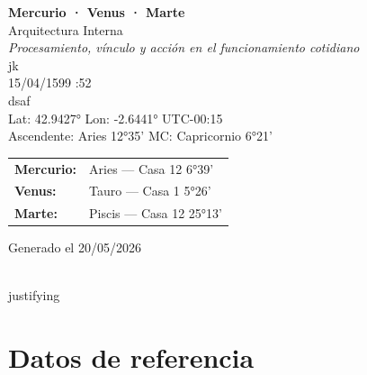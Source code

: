 \documentclass[11pt,a4paper]{article}
\begin{document}

\begin{titlepage}
  \centering

  \vspace*{2cm}

  {\Huge\bfseries\color{azulai} Mercurio · Venus · Marte}\\[0.6cm]

  {\large\color{grisai} Arquitectura Interna}\\[0.4cm]

  {\small\itshape\color{grisai}
  Procesamiento, vínculo y acción en el funcionamiento cotidiano
  }\\[2.2cm]

  {\huge\color{doradoai} jk}\\[1.6cm]

  {\Large 15/04/1599 :52}\\[0.35cm]

  {\Large dsaf}\\[0.35cm]

  {\normalsize
  Lat: 42.9427° \quad
  Lon: -2.6441° \quad
  UTC-00:15
  }\\[0.35cm]

  {\normalsize
  Ascendente: Aries 12°35'
  \quad
  MC: Capricornio 6°21'
  }\\[2.2cm]

  \renewcommand{\arraystretch}{1.35}

  \begin{tabular}{ll}
    \textbf{Mercurio:} & Aries — Casa 12 6°39' \\
    \textbf{Venus:}    & Tauro — Casa 1 5°26' \\
    \textbf{Marte:}    & Piscis — Casa 12 25°13' \\
  \end{tabular}

  \vfill

  {\small\color{grisai}
  Generado el 20/05/2026
  }

\end{titlepage}

\\justifying

\tableofcontents

\clearpage

\section{Datos de referencia}
\end{document}
